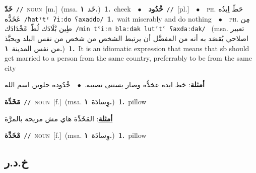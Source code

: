 \documentclass[10pt,a4paper,twoside]{article} %
\begin{document}
\begin{multicols}{2}
{\setlength\topsep{0pt}\textbf{\foreignlanguage{arabic}{خَدّ}}\ {\color{gray}\texttt{//}\color{black}}\ \textsc{noun}\ [m.]\ \color{gray}(msa. \foreignlanguage{arabic}{خَد}~\foreignlanguage{arabic}{\textbf{١.}})\color{black}\ \textbf{1.}~cheek\ \ $\bullet$\ \ \setlength\topsep{0pt}\textbf{\foreignlanguage{arabic}{خْدُود}}\ {\color{gray}\texttt{//}\color{black}}\ [pl.]\ \ $\bullet$\ \ \textsc{ph.} \color{gray} \foreignlanguage{arabic}{حَطّ اِيدُه عَخَدُّه}\color{black}\ {\color{gray}\texttt{/{\sffamily ħatˤtˤ ʔiːdo ʕaxaddo}/}\color{black}}\ \textbf{1.}~wait miserably and do nothing\ \ $\bullet$\ \ \textsc{ph.} \color{gray} \foreignlanguage{arabic}{مِن طِين بْلَادَك لُطّ عَخْدَادَك}\color{black}\ {\color{gray}\texttt{/{\sffamily min tˤiːn blaːdak lutˤtˤ ʕaxdaːdak}/}\color{black}}\ \color{gray} (msa. \foreignlanguage{arabic}{تعبير اصلاحي يُقصَد به أنه من المفضَّل أن يرتبط الشخص من شخص من نفس البلد ويحبَّذ من نفس المدينة}~\foreignlanguage{arabic}{\textbf{١.}})\color{black}\ \textbf{1.}~It is an idiomatic expression that means  that sb should get married to a person from the same country, preferrably to be from the same city\  \begin{flushright}\color{gray}\foreignlanguage{arabic}{\textbf{\underline{\foreignlanguage{arabic}{أمثلة}}}: حَط ايده عخدُّه وصار يستنى نصيبه.\ $\bullet$\ \  خْدُوده حلوين اسم الله}\end{flushright}\color{black}} \vspace{2mm}

{\setlength\topsep{0pt}\textbf{\foreignlanguage{arabic}{مَخَدِّة}}\ {\color{gray}\texttt{//}\color{black}}\ \textsc{noun}\ [f.]\ \color{gray}(msa. \foreignlanguage{arabic}{وِسادَة}~\foreignlanguage{arabic}{\textbf{١.}})\color{black}\ \textbf{1.}~pillow\  \begin{flushright}\color{gray}\foreignlanguage{arabic}{\textbf{\underline{\foreignlanguage{arabic}{أمثلة}}}: المَخَدِّة هاي مش مريحة بالمرَّة}\end{flushright}\color{black}} \vspace{2mm}

{\setlength\topsep{0pt}\textbf{\foreignlanguage{arabic}{مْخَدِّة}}\ {\color{gray}\texttt{//}\color{black}}\ \textsc{noun}\ [f.]\ \color{gray}(msa. \foreignlanguage{arabic}{وِسادَة}~\foreignlanguage{arabic}{\textbf{١.}})\color{black}\ \textbf{1.}~pillow\ } \vspace{2mm}

\vspace{-3mm}
\subsection*{\color{blue}\foreignlanguage{arabic}{خ.د.ر}\color{blue}{}} 


\end{multicols}
\end{document}

